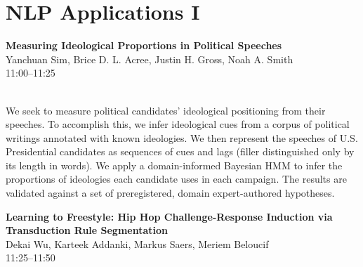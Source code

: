 \documentclass[twoside,makeidx]{book}
\begin{document}
\section{NLP Applications I}
\vspace{-1em}
\par\vspace{2em}\noindent%
\begin{minipage}{\linewidth}%
\begin{center}
\textbf{\normalsize Measuring Ideological Proportions in Political Speeches}\\
\normalsize  Yanchuan Sim,  Brice D. L. Acree,  Justin H. Gross,  Noah A. Smith\\
{\small 11:00--11:25}\\
\end{center}
\end{minipage}\\[0.5em]
\nopagebreak%
\noindent%
{\small We seek to measure political candidates' ideological positioning from their speeches.  To accomplish this, we infer ideological cues from a corpus of political writings annotated with known ideologies.  We then represent the speeches of U.S. Presidential candidates as sequences of cues and lags (filler distinguished only by its length in words).  We apply a domain-informed Bayesian HMM to infer the proportions of ideologies each candidate uses in each campaign.  The results are validated against a set of preregistered, domain expert-authored hypotheses.}
\par\vspace{2em}\noindent%
\begin{minipage}{\linewidth}%
\begin{center}
\textbf{\normalsize Learning to Freestyle: Hip Hop Challenge-Response Induction via Transduction Rule Segmentation}\\
\normalsize  Dekai Wu,  Karteek Addanki,  Markus Saers,  Meriem Beloucif\\
{\small 11:25--11:50}\\
\end{center}
\end{minipage}\\[0.5em]
\nopagebreak%
\noindent%
\end{document}
